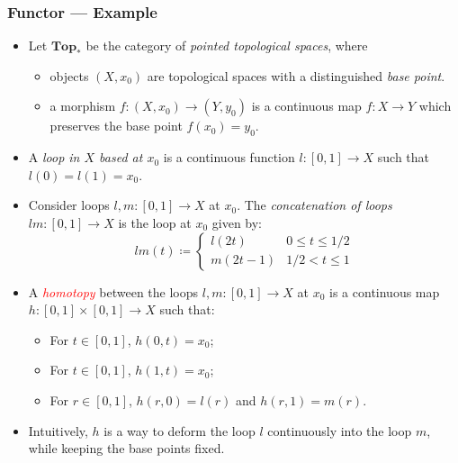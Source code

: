 \documentclass[UTF8,aspectratio=43,11pt,colorlinks,compress,openany]{beamer}%
\begin{document}
\begin{frame}\frametitle{Functor --- Example}
\setlength\abovedisplayskip{0pt}
\setlength\belowdisplayskip{0pt}
\begin{itemize}
\item Let $\mathbf{Top_*}$ be the category of \emph{pointed topological spaces}, where
\begin{itemize}
\item objects $(X,x_0)$ are topological spaces with a distinguished \emph{base point}.
\item a morphism $f:(X,x_0)\to(Y,y_0)$ is a continuous map $f:X\to Y$ which preserves the base point $f(x_0)=y_0$. 
\end{itemize}
\item A \emph{loop in $X$ based at $x_0$} is a continuous function $l:[0,1]\to X$ such that $l(0)=l(1)=x_0$.
\item Consider loops $l,m:[0,1]\to X$ at $x_0$. The \emph{concatenation of loops} $lm:[0,1]\to X$ is the loop at $x_0$ given by:
\[
lm(t) \coloneqq
\begin{cases}
l(2t) & 0\leq t \leq 1/2 \\
m(2t - 1) & 1/2 < t \leq 1
\end{cases}
\]
\item A \emph{\textcolor{red}{homotopy}} between the loops $l,m:[0,1]\to X$ at $x_0$ is a continuous map $h:[0,1]\times[0,1]\to X$ such that:
\begin{itemize}
 \item For $t\in [0,1]$, $h(0,t)=x_0$;
 \item For $t\in [0,1]$, $h(1,t)=x_0$;
 \item For $r\in [0,1]$, $h(r,0)=l(r)$ and $h(r,1)=m(r)$.
\end{itemize}
\item Intuitively, $h$ is a way to deform the loop $l$ continuously into the loop $m$, while keeping the base points fixed.
\end{itemize}
\end{frame}
\end{document}
